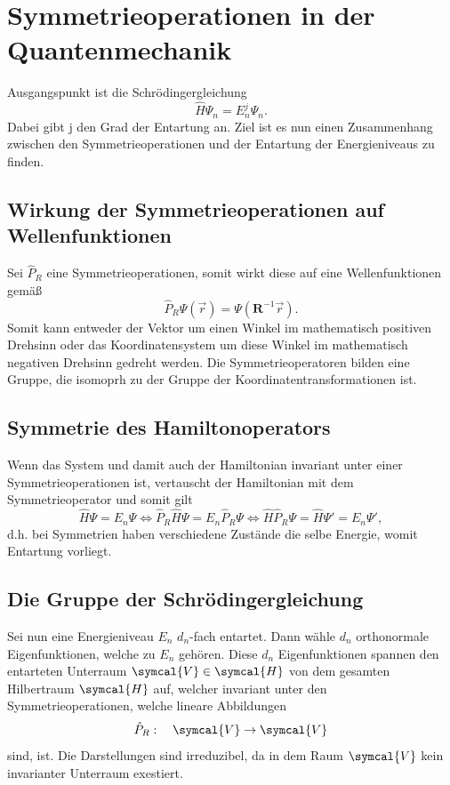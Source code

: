 \documentclass[
  captions=tableheading,  %
  titlepage=firstiscover, %
]{scrartcl}
\begin{document}
\section{Symmetrieoperationen in der Quantenmechanik}
Ausgangspunkt ist die Schrödingergleichung 
\begin{equation*}
  \hat {H} \Psi_n = E_n^j \Psi_n.
\end{equation*}
Dabei gibt j den Grad der Entartung an.
Ziel ist es nun einen Zusammenhang zwischen den Symmetrieoperationen und der Entartung der Energieniveaus 
zu finden.
\subsection{Wirkung der Symmetrieoperationen auf Wellenfunktionen}
Sei $\hat{P}_R$ eine Symmetrieoperationen, somit wirkt diese auf eine Wellenfunktionen gemäß
\begin{equation*}
  \hat{P}_R \Psi (\vec{r}) = \Psi(\mathbf{R}^{-1}\vec{r}).
\end{equation*}
Somit kann entweder der Vektor um einen Winkel im mathematisch positiven Drehsinn oder 
das Koordinatensystem um diese Winkel im mathematisch negativen Drehsinn gedreht werden.
Die Symmetrieoperatoren bilden eine Gruppe, die isomoprh zu der Gruppe der 
Koordinatentransformationen ist.
\subsection{Symmetrie des Hamiltonoperators}
\label{sub:symmhamil}
Wenn das System und damit auch der Hamiltonian invariant unter einer Symmetrieoperationen ist, vertauscht 
der Hamiltonian mit dem Symmetrieoperator und somit gilt 
\begin{equation*}
  \hat{H} \Psi = E_n \Psi \iff 
  \hat{P}_R \hat{H} \Psi = E_n \hat{P}_R \Psi \iff 
  \hat{H} \hat{P}_R \Psi = \hat{H} \Psi' = E_n \Psi',
\end{equation*}
d.h. bei Symmetrien haben verschiedene Zustände die selbe Energie, womit Entartung vorliegt.
\subsection{Die Gruppe der Schrödingergleichung}
\label{sub:schrdgroup}
Sei nun eine Energieniveau $E_n$ $d_n$-fach entartet.
Dann wähle $d_n$ orthonormale Eigenfunktionen, welche zu $E_n$ gehören.
Diese $d_n$ Eigenfunktionen spannen den entarteten Unterraum $\symcal{V} \in \symcal{H}$ 
von dem gesamten Hilbertraum $\symcal{H}$ auf, welcher invariant unter den Symmetrieoperationen, welche 
lineare Abbildungen 
\begin{equation*}
  \hat{P}_R: \quad \symcal{V} \to \symcal{V}
\end{equation*}
sind, ist.
Die Darstellungen sind irreduzibel, da in dem Raum $\symcal{V}$ kein invarianter Unterraum exestiert.
\end{document}
